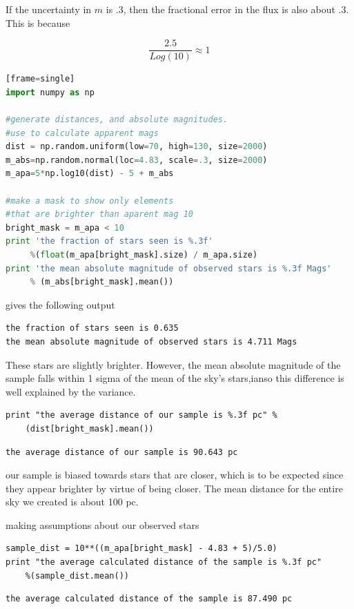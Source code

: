 \documentclass[12pt]{article}
\begin{document}
If the uncertainty in $m$ is .3, then the fractional error in the flux is also about .3. This is because


$$ \frac{2.5}{Log(10)} \approx 1 $$

\begin{lstlisting}[language=Python][frame=single]
import numpy as np

#generate distances, and absolute magnitudes.
#use to calculate apparent mags
dist = np.random.uniform(low=70, high=130, size=2000)
m_abs=np.random.normal(loc=4.83, scale=.3, size=2000)
m_apa=5*np.log10(dist) - 5 + m_abs

#make a mask to show only elements
#that are brighter than aparent mag 10
bright_mask = m_apa < 10
print 'the fraction of stars seen is %.3f'
	 %(float(m_apa[bright_mask].size) / m_apa.size)
print 'the mean absolute magnitude of observed stars is %.3f Mags'
	 % (m_abs[bright_mask].mean())
\end{lstlisting}

gives the following output
\begin{lstlisting}[frame=none]
the fraction of stars seen is 0.635
the mean absolute magnitude of observed stars is 4.711 Mags
\end{lstlisting}
These stars are slightly brighter. However, the mean absolute magnitude of the sample falls within 1 sigma of the mean of the sky's stars,ianso this difference is well explained by the variance.
\begin{lstlisting}
print "the average distance of our sample is %.3f pc" % 
	(dist[bright_mask].mean())
\end{lstlisting}

\begin{lstlisting}[frame=none]
the average distance of our sample is 90.643 pc
\end{lstlisting}
our sample is biased towards stars that are closer, which is to be expected since they appear brighter by virtue of being closer. The mean distance for the entire sky we created is about 100 pc. 

making assumptions about our observed stars
\begin{lstlisting}
sample_dist = 10**((m_apa[bright_mask] - 4.83 + 5)/5.0)
print "the average calculated distance of the sample is %.3f pc" 
	%(sample_dist.mean())
\end{lstlisting}
\begin{lstlisting}[frame=none]
the average calculated distance of the sample is 87.490 pc
\end{lstlisting}
\end{document}
